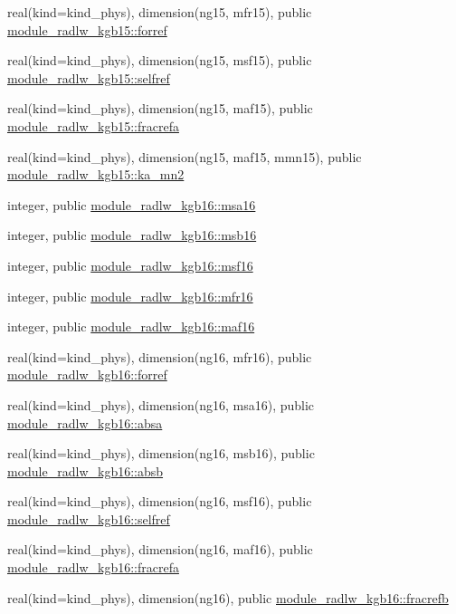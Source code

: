 \begin{DoxyCompactItemize}
\item 
real(kind=kind\+\_\+phys), dimension(ng15, mfr15), public \hyperlink{group__module__radlw__main_gada70146d20f89f059141aa4cf58a0894}{module\+\_\+radlw\+\_\+kgb15\+::forref}
\item 
real(kind=kind\+\_\+phys), dimension(ng15, msf15), public \hyperlink{group__module__radlw__main_ga1d14e9b2e607f2022d84c6fc0cd27c4e}{module\+\_\+radlw\+\_\+kgb15\+::selfref}
\item 
real(kind=kind\+\_\+phys), dimension(ng15, maf15), public \hyperlink{group__module__radlw__main_ga4b5c5f6fd9ea806843adf78ec1b43cd2}{module\+\_\+radlw\+\_\+kgb15\+::fracrefa}
\item 
real(kind=kind\+\_\+phys), dimension(ng15, maf15, mmn15), public \hyperlink{group__module__radlw__main_gaff32d89fe8fef50ff79136cc7aa50526}{module\+\_\+radlw\+\_\+kgb15\+::ka\+\_\+mn2}
\item 
integer, public \hyperlink{namespacemodule__radlw__kgb16_a95bf5395b579ca6619de3fc40c7ded79}{module\+\_\+radlw\+\_\+kgb16\+::msa16}
\item 
integer, public \hyperlink{group__module__radlw__main_ga18ad5b461d6c71b1aa2d82d5694beb03}{module\+\_\+radlw\+\_\+kgb16\+::msb16}
\item 
integer, public \hyperlink{group__module__radlw__main_ga8601911604c1d6a1b32e434159ae95d2}{module\+\_\+radlw\+\_\+kgb16\+::msf16}
\item 
integer, public \hyperlink{group__module__radlw__main_ga82777667b951207c62955e3e1492d79d}{module\+\_\+radlw\+\_\+kgb16\+::mfr16}
\item 
integer, public \hyperlink{group__module__radlw__main_gaae4c96f4a2ae49c573189f2d63ccd4a3}{module\+\_\+radlw\+\_\+kgb16\+::maf16}
\item 
real(kind=kind\+\_\+phys), dimension(ng16, mfr16), public \hyperlink{group__module__radlw__main_ga4402ed68e18459813a6c9ede5d6ba9cc}{module\+\_\+radlw\+\_\+kgb16\+::forref}
\item 
real(kind=kind\+\_\+phys), dimension(ng16, msa16), public \hyperlink{group__module__radlw__main_ga2734b420b7e8e8393a8bf1b595a3cf09}{module\+\_\+radlw\+\_\+kgb16\+::absa}
\item 
real(kind=kind\+\_\+phys), dimension(ng16, msb16), public \hyperlink{group__module__radlw__main_gae856b42252b71d4d588ea5e19e871cac}{module\+\_\+radlw\+\_\+kgb16\+::absb}
\item 
real(kind=kind\+\_\+phys), dimension(ng16, msf16), public \hyperlink{group__module__radlw__main_gafaa2554e1161bd6c983ce630d39d703a}{module\+\_\+radlw\+\_\+kgb16\+::selfref}
\item 
real(kind=kind\+\_\+phys), dimension(ng16, maf16), public \hyperlink{group__module__radlw__main_ga355dcc9f6f4955ab3d7ee0a22005c8ba}{module\+\_\+radlw\+\_\+kgb16\+::fracrefa}
\item 
real(kind=kind\+\_\+phys), dimension(ng16), public \hyperlink{group__module__radlw__main_gab93affafac8e2bb182982133a6449de4}{module\+\_\+radlw\+\_\+kgb16\+::fracrefb}
\end{DoxyCompactItemize}


